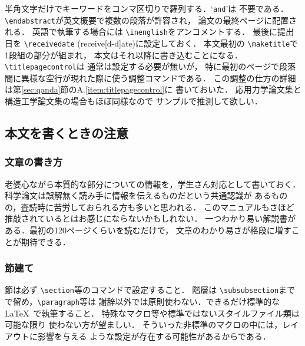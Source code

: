 \documentclass[onecolumn]{jsce}  %
\begin{document}
半角文字だけでキーワードをコンマ区切りで羅列する．`{\tt and}'は
不要である．\verb+\endabstract+が英文概要で複数の段落が許容され，
論文の最終ページに配置される．
英語で執筆する場合には \verb+\inenglish+をアンコメントする．
最後に提出日を \verb+\receivedate+ (receive[d-d]ate)に設定しておく．
本文最初の \verb+\maketitle+で1段組の部分が組まれ，
本文はそれ以降に書き込むことになる．\verb+\titlepagecontrol+は
通常は設定する必要が無いが，
特に最初のページで段落間に異様な空行が現れた際に使う調整コマンドである．
この調整の仕方の詳細は第\ref{sec:qanda}節のA.\ref{item:titlepagecontrol}に
書いておいた．
応用力学論文集と構造工学論文集の場合もほぼ同様なので
サンプルで推測して欲しい．

\subsection{本文を書くときの注意}
\label{sec:2-1}

\subsubsection{文章の書き方}
\label{sec:2-1-1}

老婆心ながら本質的な部分についての情報を，学生さん対応として書いておく．
科学論文は誤解無く読み手に情報を伝えるものだという共通認識が
あるものの，査読時に苦労しておられる方も多いと思われる．
このマニュアルもさほど推敲されているとはお感じにならないかもしれない．
一つわかり易い解説書\cite{honda}がある．最初の120ページくらいを読むだけで，
文章のわかり易さが格段に増すことが期待できる．

\subsubsection{節建て}

節は必ず \verb+\section+等のコマンドで設定すること．
階層は \verb+\subsubsection+までで留め，\verb+\paragraph+等は
謝辞以外では原則使わない．できるだけ標準的な\LaTeX\ で執筆すること．
特殊なマクロ等や標準ではないスタイルファイル類は可能な限り
使わない方が望ましい．
そういった非標準のマクロの中には，レイアウトに影響を与える
ような設定が存在する可能性があるからである．
\end{document}
